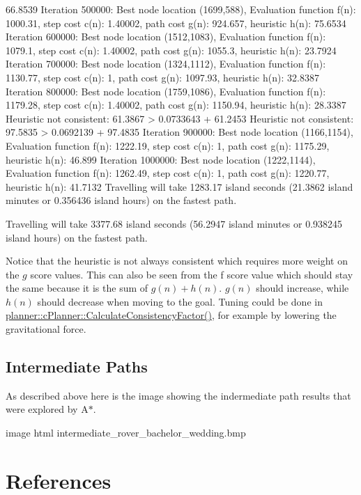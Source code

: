 \begin{DoxyCode}
       66.8539
Iteration 500000: Best node location (1699,588), 
     Evaluation function f(n): 1000.31, step cost c(n): 1.40002, path cost g(n): 924.657, heuristic h(n):
       75.6534
Iteration 600000: Best node location (1512,1083), 
     Evaluation function f(n): 1079.1, step cost c(n): 1.40002, path cost g(n): 1055.3, heuristic h(n):
       23.7924
Iteration 700000: Best node location (1324,1112), 
     Evaluation function f(n): 1130.77, step cost c(n): 1, path cost g(n): 1097.93, heuristic h(n): 32.8387
Iteration 800000: Best node location (1759,1086), 
     Evaluation function f(n): 1179.28, step cost c(n): 1.40002, path cost g(n): 1150.94, heuristic h(n):
       28.3387
Heuristic not consistent: 61.3867 > 0.0733643 + 61.2453
Heuristic not consistent: 97.5835 > 0.0692139 + 97.4835
Iteration 900000: Best node location (1166,1154), 
     Evaluation function f(n): 1222.19, step cost c(n): 1, path cost g(n): 1175.29, heuristic h(n): 46.899
Iteration 1000000: Best node location (1222,1144), 
     Evaluation function f(n): 1262.49, step cost c(n): 1, path cost g(n): 1220.77, heuristic h(n): 41.7132
Travelling will take 1283.17 island seconds (21.3862 island minutes or 0.356436 island hours) on the
       fastest path. 

Travelling will take 3377.68 island seconds (56.2947 island minutes or 0.938245 island hours) on the
       fastest path.  
\end{DoxyCode}


Notice that the heuristic is not always consistent which requires more weight on the $g$ score values. This can also be seen from the f score value which should stay the same because it is the sum of $ g(n) + h(n) $. $g(n)$ should increase, while $h(n)$ should decrease when moving to the goal. Tuning could be done in \mbox{\hyperlink{classplanner_1_1c_planner_a2e5a745f83f903662eff914d8beddb5e}{planner\+::c\+Planner\+::\+Calculate\+Consistency\+Factor()}}, for example by lowering the gravitational force.

\subsection*{Intermediate Paths}

As described above here is the image showing the indermediate path results that were explored by A$\ast$.

image html intermediate\+\_\+rover\+\_\+bachelor\+\_\+wedding.\+bmp



\section*{References}

